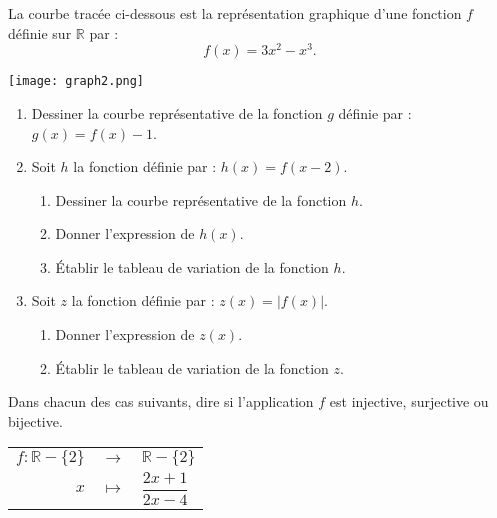 \documentclass[12pt]{article}
\begin{document}

\bigskip

La courbe tracée ci-dessous est la représentation graphique d’une fonction \( f \) définie sur \( \mathbb{R} \) par :  
\[
f(x) = 3x^2 - x^3.
\]

\bigskip

\begin{center}
    \texttt{[image: graph2.png]} %
\end{center}

\bigskip

\begin{enumerate}
    \item Dessiner la courbe représentative de la fonction \( g \) définie par : \( g(x) = f(x) - 1 \).
    
    \item Soit \( h \) la fonction définie par : \( h(x) = f(x-2) \).
    \begin{enumerate}
        \item Dessiner la courbe représentative de la fonction \( h \).
        \item Donner l’expression de \( h(x) \).
        \item Établir le tableau de variation de la fonction \( h \).
    \end{enumerate}
    
    \item Soit \( z \) la fonction définie par : \( z(x) = |f(x)| \).
    \begin{enumerate}
        \item Donner l’expression de \( z(x) \).
        \item Établir le tableau de variation de la fonction \( z \).
    \end{enumerate}
\end{enumerate}


\bigskip

Dans chacun des cas suivants, dire si l’application \( f \) est injective, surjective ou bijective.

\bigskip

\renewcommand{\arraystretch}{1.3} %
\begin{tabular}{rcl}
    \( f : \mathbb{R} - \{2\} \) & \( \to \) & \( \mathbb{R} - \{2\} \) \\
    \( x \) & \( \mapsto \) & \( \dfrac{2x+1}{2x-4} \)
\end{tabular}
\end{document}

